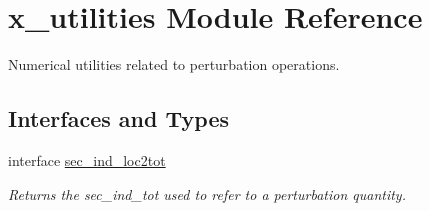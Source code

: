 \hypertarget{namespacex__utilities}{}\section{x\+\_\+utilities Module Reference}
\label{namespacex__utilities}


Numerical utilities related to perturbation operations.  


\subsection*{Interfaces and Types}
\begin{DoxyCompactItemize}
\item 
interface \hyperlink{interfacex__utilities_1_1sec__ind__loc2tot}{sec\+\_\+ind\+\_\+loc2tot}
\begin{DoxyCompactList}\small\item\em Returns the {\ttfamily sec\+\_\+ind\+\_\+tot} used to refer to a perturbation quantity. \end{DoxyCompactList}\end{DoxyCompactItemize}
